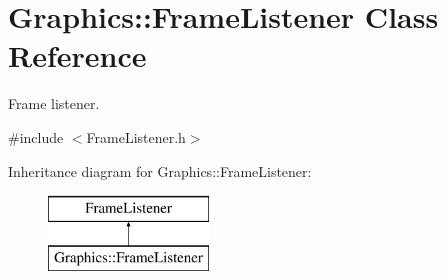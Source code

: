 \hypertarget{class_graphics_1_1_frame_listener}{\section{Graphics\-:\-:Frame\-Listener Class Reference}
\label{class_graphics_1_1_frame_listener}
}


Frame listener.  




{\ttfamily \#include $<$Frame\-Listener.\-h$>$}

Inheritance diagram for Graphics\-:\-:Frame\-Listener\-:\begin{figure}[H]
\begin{center}
\leavevmode
\includegraphics[height=2.000000cm]{class_graphics_1_1_frame_listener}
\end{center}
\end{figure}
